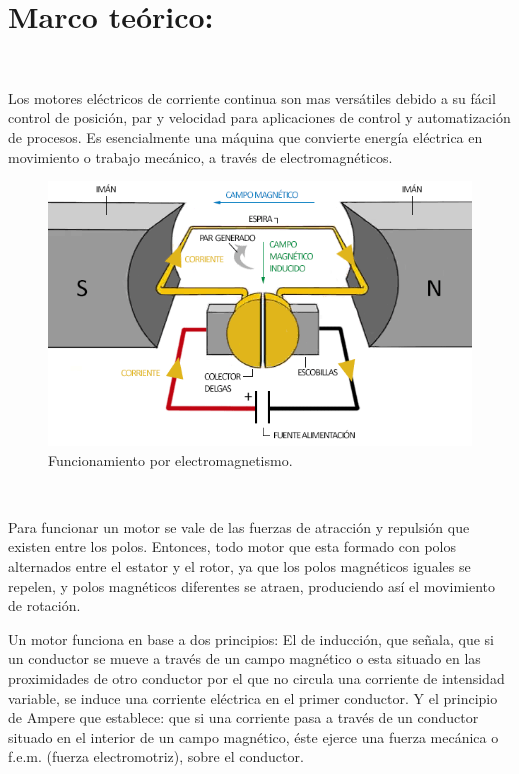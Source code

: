 \documentclass[12pt,letterpaper]{article}
\begin{document}
\section{Marco teórico:}
\

Los motores eléctricos de corriente continua son mas versátiles debido a su fácil control de posición, par y velocidad para aplicaciones de control y automatización de procesos. Es esencialmente una máquina que convierte energía eléctrica en movimiento o trabajo mecánico, a través de electromagnéticos.
\

\begin{figure}[h!]
\begin{center}
\includegraphics[scale=0.5]{images.png} 
\caption{Funcionamiento por electromagnetismo.}
\end{center}
\end{figure}


\

Para funcionar un motor se vale de las fuerzas de atracción y repulsión que existen entre los polos. Entonces, todo motor que esta formado con polos alternados entre el estator y el rotor, ya que los polos magnéticos iguales se repelen, y polos magnéticos diferentes se atraen, produciendo así el movimiento de rotación.
\

Un motor funciona en base a dos principios: El de inducción, que señala, que si un conductor se mueve a través de un campo magnético o esta situado en las proximidades de otro conductor por el que no circula una corriente de intensidad variable, se induce una corriente eléctrica en el primer conductor. Y el principio de Ampere que establece: que si una corriente pasa a través de un conductor situado en el interior de un campo magnético, éste ejerce una fuerza mecánica o f.e.m. (fuerza electromotriz), sobre el conductor.
\
\end{document}
